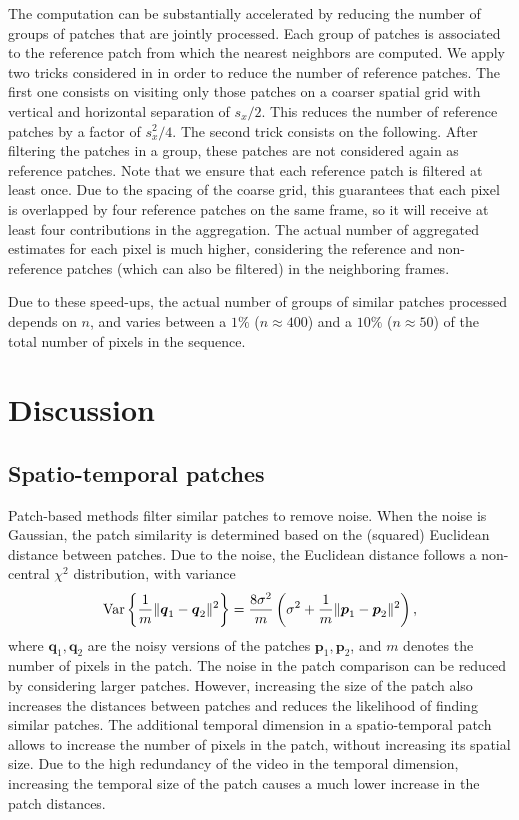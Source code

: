 \documentclass[10pt, journal, twocolumn, final, a4paper]{IEEEtran}
\newcommand{\pcomment}[1]{}
\newcommand{\ma}[1]{\boldsymbol{#1}}
\begin{document}
The computation can be substantially accelerated by reducing the 
number of groups of patches that are jointly processed.
Each group of patches is associated to the reference patch from which 
the nearest neighbors are computed.
We apply two tricks
considered in \cite{Dabov2007tip,Lebrun2013ipol} in order to reduce the number of reference patches. 
The first one consists on visiting only 
those patches on a coarser spatial grid with vertical and horizontal separation
of $s_x/2$. This reduces the number of reference patches by a factor of
$s_x^2/4$. The second trick consists on the following.  After
filtering the patches in a group, these patches are not considered again
as reference patches. 
Note that we ensure that each reference patch is filtered at least once. 
Due to the spacing of the coarse grid, this guarantees that each pixel is
overlapped by four reference patches on the same frame, so it will receive at
least four contributions in the aggregation. The actual number of aggregated
estimates for each pixel is much higher, considering the reference and
non-reference patches (which can also be filtered) in the neighboring frames.

Due to these speed-ups, the actual number of groups of similar patches processed
depends on $n$, and varies between a $1\%$ ($n \approx 400$)  and a $10\%$ ($n
\approx 50$) of the total number of pixels in the sequence. 
\pcomment{Check this numbers!}


\section{Discussion}
\label{sec:discussion}

\subsection{Spatio-temporal patches}
\label{sse:spatio-temporal-patches}
Patch-based methods filter similar patches to remove noise. When the noise is
Gaussian, the patch similarity is determined based on the (squared) Euclidean distance 
between patches. Due to the noise, the Euclidean distance follows a non-central
$\chi^2$ distribution, with variance
\[\textnormal{Var}\left\{\frac1{m}\|\ma q_1 - \ma q_2\|^2\right\} = \frac{8\sigma^2}{m}\left(\sigma^2 + \frac1{m}\|\ma p_1 - \ma p_2\|^2\right),\]
where $\ma q_1, \ma q_2$ are the noisy versions of the patches $\ma p_1, \ma p_2$, 
and $m$ denotes the number of pixels in the patch. The noise in the patch comparison
can be reduced by considering larger patches.
However, increasing the size of the patch also increases the distances between
patches and reduces the likelihood of finding similar patches.
%
The additional temporal dimension in a spatio-temporal patch allows to increase
the number of pixels in the patch, without increasing its spatial size.
Due to the high redundancy of the video in the temporal dimension, increasing the 
temporal size of the patch causes a much lower increase in the patch distances.
%
\end{document}
